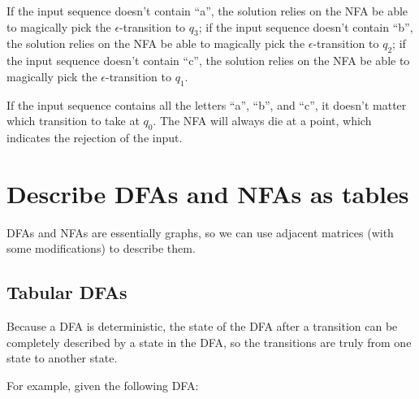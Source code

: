 \documentclass[12pt, letterpaper, oneside]{book}
\begin{document}
If the input sequence doesn't contain ``a'', the solution relies on the NFA be able to magically pick the
$\epsilon$-transition to $q_3$; if the input sequence doesn't contain ``b'', the solution relies on the NFA be able to
magically pick the $\epsilon$-transition to $q_2$; if the input sequence doesn't contain ``c'', the solution relies on
the NFA be able to magically pick the $\epsilon$-transition to $q_1$.

If the input sequence contains all the letters ``a'', ``b'', and ``c'', it doesn't matter which transition to take at
$q_0$. The NFA will always die at a point, which indicates the rejection of the input.

\section{Describe DFAs and NFAs as tables}

DFAs and NFAs are essentially graphs, so we can use adjacent matrices (with some modifications) to describe them.

\subsection{Tabular DFAs}

Because a DFA is deterministic, the state of the DFA after a transition can be completely described by a state in the
DFA, so the transitions are truly from one state to another state.

For example, given the following DFA:

\end{document}
